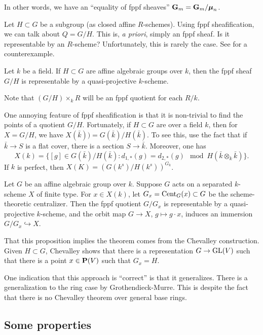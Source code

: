 \documentclass{article}
\begin{document}
In other words, we have an ``equality of fppf sheaves'' 
$\mathbf{G}_m = \mathbf{G}_m/\boldsymbol\mu_n$. 

Let $H\subset G$ be a subgroup (as closed affine $R$-schemes). Using fppf 
sheafification, we can talk about $Q=G/H$. This is, \emph{a priori}, simply 
an fppf sheaf. Is it representable by an $R$-scheme? Unfortunately, this is 
rarely the case. See \cite{r70} for a counterexample. 

\begin{theorem}
Let $k$ be a field. If $H\subset G$ are affine algebraic groups over $k$, then 
the fppf sheaf $G/H$ is representable by a quasi-projective $k$-scheme. 
\end{theorem}

Note that $(G/H)\times_k R$ will be an fppf quotient for each $R/k$. 

One annoying feature of fppf sheafification is that it is non-trivial to find 
the points of a quotient $G/H$. Fortunately, if $H\subset G$ are over a field 
$k$, then for $X=G/H$, we have $X(\bar k)) = G(\bar k)/H(\bar k)$. To see this, 
use the fact that if $\bar k\to S$ is a flat cover, there is a section 
$S\to \bar k$. Moreover, one has 
\[
  X(k) = \{[g]\in G(\bar k)/H(\bar k):d_{1,\ast}(g) = d_{2,\ast}(g)\mod H(\bar k\otimes_k \bar k)\} .
\]
If $k$ is perfect, then $X(K)=(G(k^s)/H(k^s))^{G_k}$. 

\begin{proposition}
Let $G$ be an affine algebraic group over $k$. Suppose $G$ acts on a separated 
$k$-scheme $X$ of finite type. For $x\in X(k)$, let 
$G_x=\operatorname{Cent}_G(x)\subset G$ be the scheme-theoretic centralizer. Then the 
fppf quotient $G/G_x$ is representable by a quasi-projective $k$-scheme, and 
the orbit map $G\to X$, $g\mapsto g\cdot x$, induces an immersion 
$G/G_x\hookrightarrow X$. 
\end{proposition}

That this proposition implies the theorem comes from the Chevalley construction. 
Given $H\subset G$, Chevalley shows that there is a representation 
$G\to \operatorname{GL}(V)$ such that there is a point 
$x\in \mathbf{P}(V)$ such that $G_x=H$. 

One indication that this approach is ``correct'' is that it generalizes. 
There is a generalization to the ring case by Grothendieck-Murre. This is 
despite the fact that there is no Chevalley theorem over general base rings. 


\subsection{Some properties}
\end{document}
